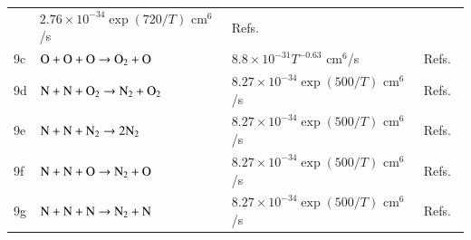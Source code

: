 \documentclass[twoside,9pt,twocolumn]{aiaa}
\begin{document}
\begin{table}
\begin{threeparttable}
\begin{tabular}{llll}
       & $2.76 \times 10^{-34} \exp(720/T)$ cm$^6$/s 
       & Refs.\ \cite{misc:1997:aleksandrov}\\
    9c  & $\rm O + O + O \rightarrow O_2+O$   
       & $8.8 \times 10^{-31} T^{-0.63}$ cm$^6$/s 
       & Refs.\ \cite{misc:1997:aleksandrov}\\
    9d  & $\rm N + N + O_2 \rightarrow N_2 + O_2$   
       & $8.27 \times 10^{-34} \exp(500/T)$ cm$^6$/s 
       & Refs.\ \cite{misc:1997:aleksandrov}\\
    9e  & $\rm N + N + N_2 \rightarrow 2 N_2$   
       & $8.27 \times 10^{-34} \exp(500/T)$ cm$^6$/s 
       & Refs.\ \cite{misc:1997:aleksandrov}\\
    9f  & $\rm N + N + O \rightarrow N_2 + O$   
       & $8.27 \times 10^{-34} \exp(500/T)$ cm$^6$/s 
       & Refs.\ \cite{misc:1997:aleksandrov}\\
    9g  & $\rm N + N + N \rightarrow N_2 + N $   
       & $8.27 \times 10^{-34} \exp(500/T)$ cm$^6$/s 
       & Refs.\ \cite{misc:1997:aleksandrov}\\
    \bottomrule
    \end{tabular}
   \end{threeparttable}
\end{table}
%
\end{document}
